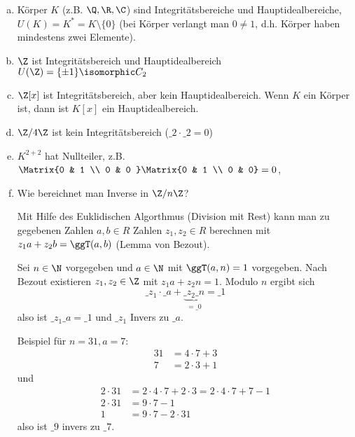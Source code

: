 \begin{ex} \label{1.2}
	\begin{enumerate}[a)]
		\item
			Körper $K$ (z.B. $\Q, \R, \C$) sind Integritätsbereiche und Hauptidealbereiche, $U(K) = K^* = K \setminus \{0\}$ (bei Körper verlangt man $0 \neq 1$, d.h. Körper haben mindestens zwei Elemente).
		\item
			$\Z$ ist Integritätsbereich und Hauptidealbereich $U(\Z) = \{ \pm 1 \} \isomorphic C_2$
		\item
			$\Z[x]$ ist Integritätsbereich, aber kein Hauptidealbereich.
			Wenn $K$ ein Körper ist, dann ist $K[x]$ ein Hauptidealbereich.
		\item
			$\Z / 4 \Z$ ist kein Integritätsbereich ($\_ 2 \cdot \_ 2 = 0$)
		\item
			$K^{2+2}$ hat Nullteiler, z.B. $\Matrix{0 & 1 \\ 0 & 0 } \Matrix{0 & 1 \\ 0 & 0} = 0$,
		\item
			Wie bereichnet man Inverse in $\Z / n \Z$?

			Mit Hilfe des Euklidischen Algorthmus (Division mit Rest) kann man zu gegebenen Zahlen $a,b \in R$ Zahlen $z_1, z_2 \in R$ berechnen mit $z_1 a + z_2 b = \ggT(a,b)$ (Lemma von Bezout).

			Sei $n \in \N$ vorgegeben und $a \in \N$ mit $\ggT(a, n) = 1$ vorgegeben.
			Nach Bezout existieren $z_1, z_2 \in \Z$ mit $z_1 a + z_2 n = 1$.
			Modulo $n$ ergibt sich
			\[
				\_ z_1 \cdot \_ a + \underbrace{\_ z_2 \_ n}_{=\_ 0} = \_ 1
			\]
			also ist $\_z_1 \_ a = \_ 1$ und $\_ z_1$ Invers zu $\_ a$.

			Beispiel für $n = 31, a = 7$:
			\begin{align*}
				31 &= 4 \cdot 7 + 3 \\
				7 &= 2 \cdot 3 + 1
			\end{align*}
			und
			\begin{align*}
				2 \cdot 31 &= 2 \cdot 4 \cdot 7 + 2 \cdot 3 = 2 \cdot 4 \cdot 7 + 7 - 1 \\
				2 \cdot 31 &= 9 \cdot 7 - 1 \\
				1 &= 9 \cdot 7 - 2 \cdot 31
			\end{align*}
			also ist $\_ 9$ invers zu $\_ 7$.
	\end{enumerate}
\end{ex}

